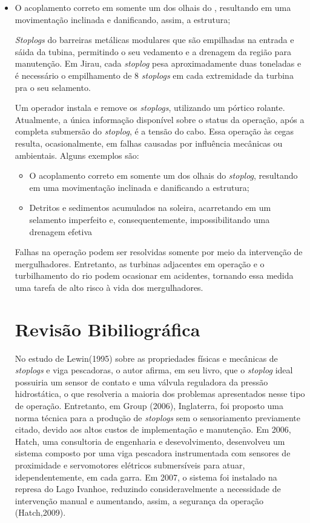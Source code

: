 \begin{itemize}
  \item O acoplamento correto em somente um dos olhais do ,
  resultando em uma movimentação inclinada e danificando, assim, a estrutura;

\textit{Stoplogs} do barreiras metálicas modulares que são empilhadas na entrada
e sáida da tubina, permitindo o seu vedamento e a drenagem da região para
manutenção. Em Jirau, cada \textit{stoplog} pesa aproximadamente duas toneladas
e é necessário o empilhamento de 8 \textit{stoplogs} em cada extremidade da
turbina pra o seu selamento.

Um operador instala e remove os \textit{stoplogs}, utilizando um pórtico
rolante. Atualmente, a única informação disponível sobre o status da operação,
após a completa submersão do \textit{stoplog}, é a tensão do cabo. Essa operação
às cegas resulta, ocasionalmente, em falhas causadas por influência mecânicas ou
ambientais. Alguns exemplos são:
\begin{itemize}
  \item O acoplamento correto em somente um dos olhais do \textit{stoplog},
  resultando em uma movimentação inclinada e danificando a estrutura;

  \item Detritos e sedimentos acumulados na soleira, acarretando em um selamento
  imperfeito e, consequentemente, impossibilitando uma drenagem efetiva
\end{itemize}

Falhas na operação podem ser resolvidas somente por meio da intervenção de
mergulhadores. Entretanto, as turbinas adjacentes em operação e o turbilhamento
do rio podem ocasionar em acidentes, tornando essa medida uma tarefa de alto risco à vida dos
mergulhadores.

\section*{Revisão Bibiliográfica}

No estudo de Lewin(1995) sobre as propriedades físicas e mecânicas de 
\textit{stoplogs} e viga pescadoras, o autor afirma, em seu livro, que o
\textit{stoplog} ideal possuiria um sensor de contato e uma válvula reguladora
da pressão hidrostática, o que resolveria a maioria dos problemas apresentados
nesse tipo de operação. Entretanto, em Group (2006), Inglaterra, foi proposto
uma norma técnica para a produção de \textit{stoplogs} sem o sensoriamento
previamente citado, devido aos altos custos de implementação e manutenção. Em
2006, Hatch, uma consultoria de engenharia e desevolvimento, desenvolveu um
sistema composto por uma viga pescadora instrumentada com sensores de
proximidade e servomotores elétricos submersíveis para atuar, idependentemente,
em cada garra. Em 2007, o sistema foi instalado na represa do Lago Ivanhoe,
reduzindo consideravelmente a necessidade de intervenção manual e aumentando,
assim, a segurança da operação (Hatch,2009).


\end{itemize}

